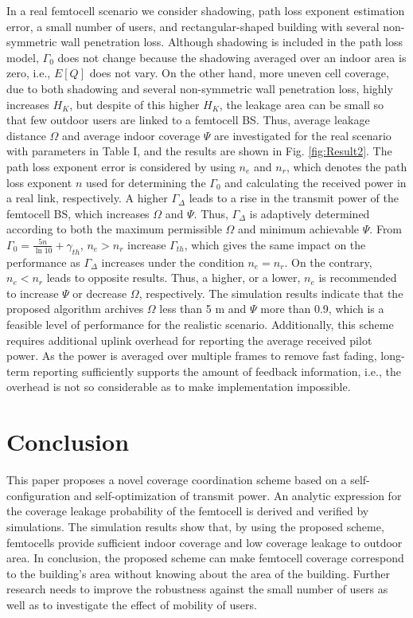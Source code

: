 \documentclass[draftclsnofoot,12pt,onecolumn]{IEEEtran}
\begin{document}
In a real femtocell scenario we consider shadowing, path loss exponent
estimation error, a small number of users, and rectangular-shaped building with several non-symmetric wall penetration loss.
Although shadowing is included in the path loss model, $\Gamma_0$
does not change because the shadowing averaged over an indoor area
is zero, i.e., $E[Q]$ does not vary. On the other hand, more uneven
cell coverage, due to both shadowing and several non-symmetric wall penetration loss, highly increases $H_K$, but despite
of this higher $H_K$, the leakage area can be small so that few
outdoor users are linked to a femtocell BS. Thus, average leakage distance $\Omega$ and average indoor coverage $\Psi$ are investigated for the real scenario with parameters in Table I, and the results are shown in Fig. \ref{fig:Result2}. The path loss exponent error is considered by
using $n_{e}$ and $n_{r}$, which denotes the path loss exponent $n$ used for determining the
$\Gamma_0$ and calculating the received power in a real link,
respectively. A higher $\Gamma_{\Delta}$ leads to a rise in the
transmit power of the femtocell BS, which increases $\Omega$ and
$\Psi$. Thus, $\Gamma_{\Delta}$ is adaptively determined according
to both the maximum permissible $\Omega$ and minimum achievable
$\Psi$. From $\Gamma_0=\frac{5n}{\ln10}+\gamma_{th}$,
$n_{e}>n_{r}$ increase $\Gamma_{th}$, which gives the same impact
on the performance as $\Gamma_{\Delta}$ increases under the
condition $n_{e}=n_{r}$. On the contrary, $n_{e}<n_{r}$ leads to
opposite results. Thus, a higher, or a lower, $n_{e}$ is
recommended to increase $\Psi$ or decrease $\Omega$, respectively.
The simulation results indicate that the proposed algorithm archives $\Omega$ less than 5 m and $\Psi$ more than 0.9, which is a feasible level of
performance for the realistic scenario. Additionally, this scheme
requires additional uplink overhead for reporting the average
received pilot power. As the power is averaged over multiple frames
to remove fast fading, long-term reporting sufficiently supports the
amount of feedback information, i.e., the overhead is not so
considerable as to make implementation impossible.

\section{Conclusion}\label{sec:conclusion}
This paper proposes a novel coverage coordination scheme based on a
self-configuration and self-optimization of transmit power. An
analytic expression for the coverage leakage probability of the
femtocell is derived and verified by simulations. The simulation
results show that, by using the proposed scheme, femtocells provide
sufficient indoor coverage and low coverage leakage to outdoor area.
In conclusion, the proposed scheme can make femtocell coverage
correspond to the building's area without knowing about the area of
the building. Further research needs to improve the robustness
against the small number of users as well as to investigate the effect of mobility of users.
\end{document}
